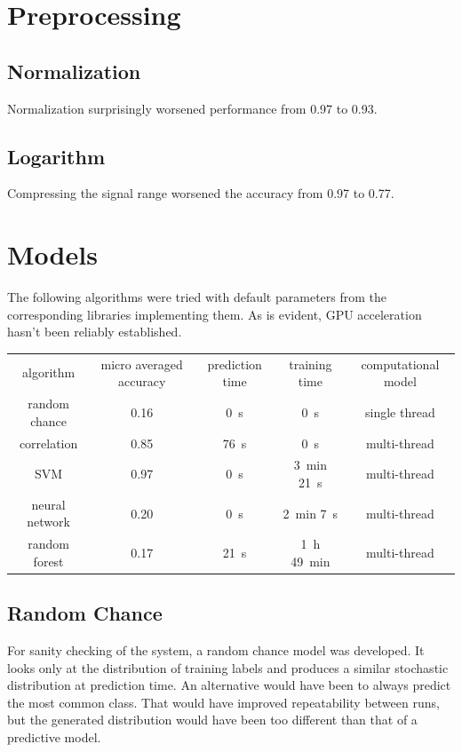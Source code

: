 \documentclass{article}
\begin{document}
\section{Preprocessing}
\subsection{Normalization}
Normalization surprisingly worsened performance from 0.97 to 0.93.


\subsection{Logarithm}
Compressing the signal range worsened the accuracy from 0.97 to 0.77.


\section{Models}
The following algorithms were tried with default parameters from the corresponding libraries implementing them.
As is evident, GPU acceleration hasn't been reliably established.
\\ \par
{}
\begin{tabular}{ c | c | c | c | c }
algorithm      & micro averaged accuracy & prediction time  & training time                    & computational model \\
random chance  & 0.16                    & \SI{0}{\second}  & \SI{0}{\second}                  & single thread \\
correlation    & 0.85                    & \SI{76}{\second} & \SI{0}{\second}                  & multi-thread \\
SVM            & 0.97                    & \SI{0}{\second}  & \SI{3}{\minute} \SI{21}{\second} & multi-thread \\
neural network & 0.20                    & \SI{0}{\second}  & \SI{2}{\minute} \SI{7}{\second}  & multi-thread \\
random forest  & 0.17                    & \SI{21}{\second} & \SI{1}{\hour} \SI{49}{\minute}   & multi-thread \\
\end{tabular}


\subsection{Random Chance}
For sanity checking of the system, a random chance model was developed.
It looks only at the distribution of training labels and produces a similar stochastic distribution at prediction time.
An alternative would have been to always predict the most common class.
That would have improved repeatability between runs, but the generated distribution would have been too different than that of a predictive model.
\end{document}
